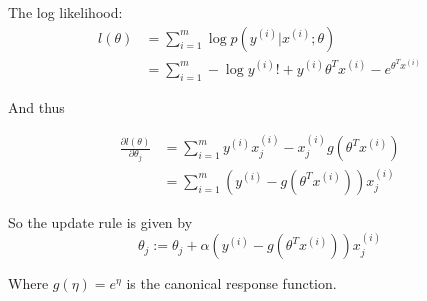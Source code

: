 \begin{answer}
    The log likelihood:
    $$
    \begin{aligned}
l(\theta) &= \sum_{i=1}^m\log p(y^{(i)}|x^{(i)}; \theta) \\
&= \sum_{i=1}^m-\log y^{(i)}! + y^{(i)}\theta^Tx^{(i)} - e^{\theta^Tx^{(i)}}
\end{aligned}
$$

And thus 

$$
\begin{aligned}
\frac{\partial l(\theta)}{\partial \theta_j} &= \sum_{i=1}^my^{(i)}x^{(i)}_j - x^{(i)}_j g(\theta^Tx^{(i)})\\
&= \sum_{i=1}^m (y^{(i)} - g(\theta^Tx^{(i)}))x^{(i)}_j
\end{aligned}
$$

So the update rule is given by
$$
\theta_j := \theta_j + \alpha (y^{(i)} - g(\theta^Tx^{(i)}))x_j^{(i)}
$$

    Where $g(\eta) = e^\eta$ is the canonical response function.

\end{answer}
